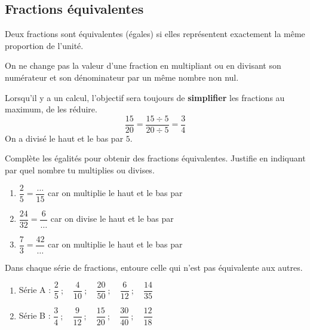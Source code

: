 \documentclass[../../syllabus_1.tex]{subfiles}
\begin{document}
\begin{itemize}
\subsection{Fractions équivalentes}
 
Deux fractions sont équivalentes (égales) si elles représentent exactement la même proportion de l'unité.
 
On ne change pas la valeur d'une fraction en multipliant ou en divisant son numérateur et son dénominateur par un même nombre non nul.

Lorsqu'il y a un calcul, l'objectif sera toujours de \textbf{simplifier} les fractions au maximum, de les réduire.
\begin{equation*}
    \dfrac{15}{20} = \dfrac{15 \div 5}{20 \div 5} = \dfrac{3}{4}
\end{equation*}
On a divisé le haut et le bas par $5$.
 
\begin{exercise}
    Complète les égalités pour obtenir des fractions équivalentes. Justifie en indiquant par quel nombre tu multiplies ou divises.
    \begin{enumerate}[itemsep=1.2cm]
        \item $\dfrac{2}{5} = \dfrac{\dots}{15}$ \qquad car on multiplie le haut et le bas par \dotfill
        \item $\dfrac{24}{32} = \dfrac{6}{\dots}$ \qquad car on divise le haut et le bas par \dotfill
        \item $\dfrac{7}{3} = \dfrac{42}{\dots}$ \qquad car on multiplie le haut et le bas par \dotfill
    \end{enumerate}
\end{exercise}
 
\begin{exercise}
    Dans chaque série de fractions, entoure celle qui n'est pas équivalente aux autres.
    \begin{enumerate}[itemsep=1cm]
        \item Série A : \quad $\dfrac{2}{5} \ ; \quad \dfrac{4}{10} \ ; \quad \dfrac{20}{50} \ ; \quad \dfrac{6}{12} \ ; \quad \dfrac{14}{35}$
        \item Série B : \quad $\dfrac{3}{4} \ ; \quad \dfrac{9}{12} \ ; \quad \dfrac{15}{20} \ ; \quad \dfrac{30}{40} \ ; \quad \dfrac{12}{18}$
    \end{enumerate}
\end{exercise}


\end{itemize}
\end{document}
